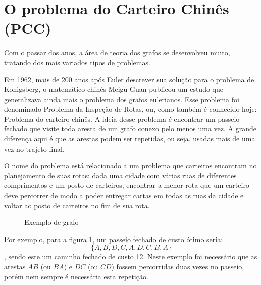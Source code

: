 \documentclass[12pt, a4paper]{article}
\begin{document}
\section{O problema do Carteiro Chinês (PCC)}

Com o passar dos anos, a área de teoria dos grafos se desenvolveu muito, tratando dos mais variados tipos de problemas.

Em 1962, mais de 200 anos após Euler descrever sua solução para o problema de Konigsberg, o matemático chinês Meigu Guan publicou um estudo que generalizava ainda mais o problema dos grafos eulerianos. 
Esse problema foi denominado Problema da Inspeção de Rotas, ou, como também é conhecido hoje: Problema do carteiro chinês.
A ideia desse problema é encontrar um passeio fechado que visite toda aresta de um grafo conexo pelo menos uma vez. 
A grande diferença aqui é que as arestas podem ser repetidas, ou seja, usadas mais de uma vez no trajeto final.

O nome do problema está relacionado a um problema que carteiros encontram no planejamento de suas rotas: dada uma cidade com várias ruas de diferentes comprimentos e um posto de carteiros, encontrar a menor rota que um carteiro deve percorrer de modo a poder entregar cartas em todas as ruas da cidade e voltar ao posto de carteiros no fim de sua rota.

\begin{figure} 
    \centering
	\caption{Exemplo de grafo}
	\label{graph}
\end{figure}

Por exemplo, para a figura \ref{graph}, um passeio fechado de custo ótimo seria: \[ \{A, B, D, C, A, D, C, B, A\} \], sendo este um caminho fechado de custo 12.
Neste exemplo foi necessário que as arestas $AB$ (ou $BA$) e $DC$ (ou $CD$) fossem percorridas duas vezes no passeio, porém nem sempre é necessária esta repetição.
\end{document}

